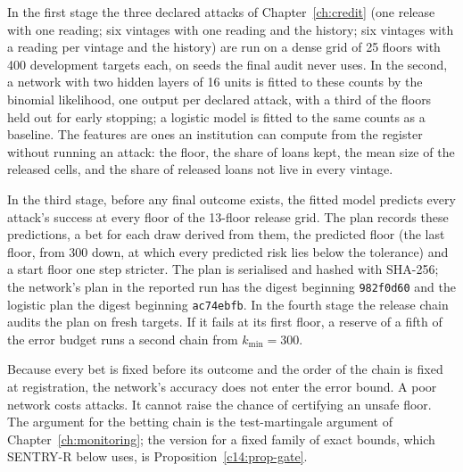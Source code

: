 In the first stage the three declared attacks of Chapter~\ref{ch:credit} (one release
with one reading; six vintages with one reading and the history; six vintages with a
reading per vintage and the history) are run on a dense grid of 25 floors with 400
development targets each, on seeds the final audit never uses. In the second, a
network with two hidden layers of 16 units is fitted to these counts by the binomial
likelihood, one output per declared attack, with a third of the floors held out for
early stopping; a logistic model is fitted to the same counts as a baseline. The
features are ones an institution can compute from the register without running an
attack: the floor, the share of loans kept, the mean size of the released cells, and
the share of released loans not live in every vintage.

In the third stage, before any final outcome exists, the fitted model predicts every
attack's success at every floor of the 13-floor release grid. The plan records these
predictions, a bet for each draw derived from them, the predicted floor (the last
floor, from 300 down, at which every predicted risk lies below the tolerance) and a
start floor one step stricter. The plan is serialised and hashed with SHA-256; the
network's plan in the reported run has the digest beginning \texttt{982f0d60} and the
logistic plan the digest beginning \texttt{ac74ebfb}. In the fourth stage the release
chain audits the plan on fresh targets. If it fails at its first floor, a reserve of a
fifth of the error budget runs a second chain from $k_{\min}=300$.

Because every bet is fixed before its outcome and the order of the chain is fixed at
registration, the network's accuracy does not enter the error bound. A poor network
costs attacks. It cannot raise the chance of certifying an unsafe floor. The argument
for the betting chain is the test-martingale argument of
Chapter~\ref{ch:monitoring}; the version for a fixed family of exact bounds, which
SENTRY-R below uses, is Proposition~\ref{c14:prop-gate}.

